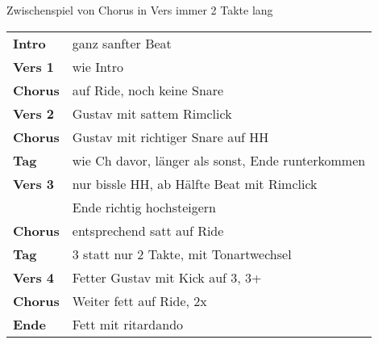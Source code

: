
Zwischenspiel von Chorus in Vers immer 2 Takte lang

\begin{tabular}{p{1.6cm}l}
	\textbf{Intro}  & ganz sanfter Beat                                 \\
	\textbf{Vers 1} & wie Intro                                         \\
	\textbf{Chorus} & auf Ride, noch keine Snare                        \\
	\textbf{Vers 2} & Gustav mit sattem Rimclick                        \\
	\textbf{Chorus} & Gustav mit richtiger Snare auf HH                 \\
	\textbf{Tag}    & wie Ch davor, länger als sonst, Ende runterkommen \\
	\textbf{Vers 3} & nur bissle HH, ab Hälfte Beat mit Rimclick        \\
	                & Ende richtig hochsteigern                         \\
	\textbf{Chorus} & entsprechend satt auf Ride                        \\
	\textbf{Tag}    & 3 statt nur 2 Takte, mit Tonartwechsel            \\
	\textbf{Vers 4} & Fetter Gustav mit Kick auf 3, 3+                  \\
	\textbf{Chorus} & Weiter fett auf Ride, 2x                          \\
	\textbf{Ende}   & Fett mit ritardando                               \\
\end{tabular}
